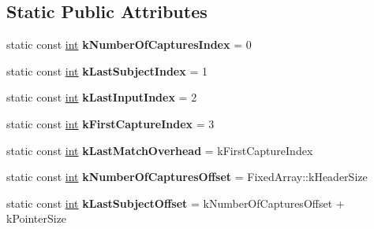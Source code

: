 \subsection*{Static Public Attributes}
\begin{DoxyCompactItemize}
\item 
\mbox{\label{classv8_1_1internal_1_1RegExpMatchInfo_ad0b361e2b690a62787c85bc9165bc248}} 
static const \mbox{\hyperlink{classint}{int}} {\bfseries k\+Number\+Of\+Captures\+Index} = 0
\item 
\mbox{\label{classv8_1_1internal_1_1RegExpMatchInfo_aec28dcf1cbdeb1d073587bd7772410ff}} 
static const \mbox{\hyperlink{classint}{int}} {\bfseries k\+Last\+Subject\+Index} = 1
\item 
\mbox{\label{classv8_1_1internal_1_1RegExpMatchInfo_a96414d91d892482950be0a8c70ea5b2e}} 
static const \mbox{\hyperlink{classint}{int}} {\bfseries k\+Last\+Input\+Index} = 2
\item 
\mbox{\label{classv8_1_1internal_1_1RegExpMatchInfo_a626b3e726ab46728413cd7f2154e9c26}} 
static const \mbox{\hyperlink{classint}{int}} {\bfseries k\+First\+Capture\+Index} = 3
\item 
\mbox{\label{classv8_1_1internal_1_1RegExpMatchInfo_ad935b63d71dc60145f17889a73cf657a}} 
static const \mbox{\hyperlink{classint}{int}} {\bfseries k\+Last\+Match\+Overhead} = k\+First\+Capture\+Index
\item 
\mbox{\label{classv8_1_1internal_1_1RegExpMatchInfo_adaf35940cc11f089ecd277ceb728ee53}} 
static const \mbox{\hyperlink{classint}{int}} {\bfseries k\+Number\+Of\+Captures\+Offset} = Fixed\+Array\+::k\+Header\+Size
\item 
\mbox{\label{classv8_1_1internal_1_1RegExpMatchInfo_aeb827cfdf451fee13ce9593b71591259}} 
static const \mbox{\hyperlink{classint}{int}} {\bfseries k\+Last\+Subject\+Offset} = k\+Number\+Of\+Captures\+Offset + k\+Pointer\+Size
\item 
\mbox{\label{classv8_1_1internal_1_1RegExpMatchInfo_a83c21f9d7a99f84c62a49a9c41e85d1c}} 

\end{DoxyCompactItemize}
